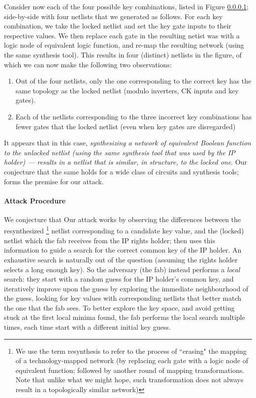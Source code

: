 Consider now each of the four possible key combinations, listed in Figure \ref{}; side-by-side with four netlists that we generated as follows. For each key combination, we take the locked netlist and set the key gate inputs to their respective values. We then replace each gate in the resulting netist was with a logic node of equivalent logic function, and re-map the resulting network (using the same synthesis tool). This results in four (distinct) netlists in the figure, of which we can now make the following two observations:

\begin{enumerate}
    \item Out of the four netlists, only the one corresponding to the correct key has the same topology as the locked netlist (modulo inverters, CK inputs and key gates).
    \item Each of the netlists corresponding to the three incorrect key combinations has fewer gates that the locked netlist (even when key gates are disregarded)
\end{enumerate}

It appears that in this case, \emph{synthesizing a network of equivalent Boolean function to the unlocked netlist (using the same synthesis tool that was used by the IP holder) --- results in a netlist that is similar, \emph{in structure}, to the locked one}. Our conjecture that the same holds for a wide class of circuits and synthesis tools; forms the premise for our attack.

\paragraph{Attack Procedure} We conjecture that Our attack works by observing the differences between the resynthesized \footnote{We use the term resynthesis to refer to the process of ``erasing" the mapping of a technology-mapped network (by replacing each gate with a logic node of equivalent function; followed by another round of mapping transformations. Note that unlike what we might hope, such transformation does not always result in a topologically similar network) } netlist corresponding to a candidate key value, and the (locked) netlist which the fab receives from the IP rights holder; then uses this information to guide a search for the correct common key of the IP holder. An exhaustive search is naturally out of the question (assuming the rights holder selects a long enough key). So the adversary (the fab) instead performs a \emph{local} search: they start with a random guess for the IP holder's common key, and iteratively improve upon the guess by exploring the immediate neighbourhood of the guess, looking for key values with corresponding netlists that better match the one that the fab sees. To better explore the key space, and avoid getting stuck at the first local minima found, the fab performs the local search multiple times, each time start with a different initial key guess. 

